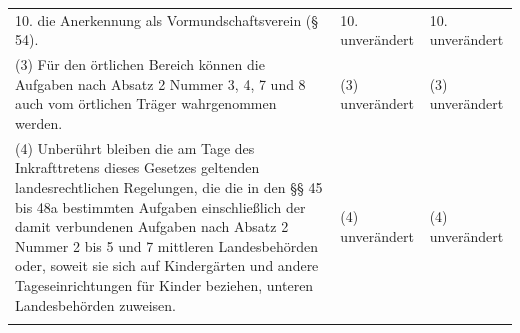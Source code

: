 \documentclass[10pt,a4paper,landscape]{article}
\begin{document}
\begin{longtable}{|L{8.2cm}|L{8.2cm}|L{8.2cm}|}
\hhline{|---|}
10.  \newline die Anerkennung als  \newline Vormundschaftsverein (\S{} 54). & 10. unverändert & 10. unverändert \\
\hhline{|---|}
(3) Für den örtlichen Bereich können die  \newline Aufgaben nach Absatz 2 Nummer 3, 4, 7  \newline und 8 auch vom örtlichen Träger  \newline wahrgenommen werden. & (3) unverändert & (3) unverändert \\
\hhline{|---|}
(4) Unberührt bleiben die am Tage des  \newline Inkrafttretens dieses Gesetzes geltenden  \newline landesrechtlichen Regelungen, die die in  \newline den \S{}\S{} 45 bis 48a bestimmten Aufgaben  \newline einschließlich der damit verbundenen  \newline Aufgaben nach Absatz 2 Nummer 2 bis 5  \newline und 7 mittleren Landesbehörden oder,  \newline soweit sie sich auf Kindergärten und  \newline andere Tageseinrichtungen für Kinder  \newline beziehen, unteren Landesbehörden  \newline zuweisen. & (4) unverändert & (4) unverändert \\
\hhline{|---|}

\end{longtable}
\end{document}
